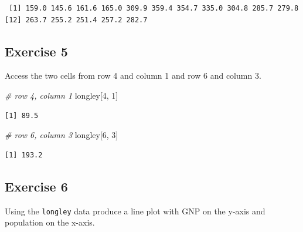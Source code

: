 \documentclass[]{book}
\newenvironment{Shaded}{\begin{snugshade}}{\end{snugshade}}
\newcommand{\KeywordTok}[1]{\textcolor[rgb]{0.13,0.29,0.53}{\textbf{#1}}}
\newcommand{\DataTypeTok}[1]{\textcolor[rgb]{0.13,0.29,0.53}{#1}}
\newcommand{\DecValTok}[1]{\textcolor[rgb]{0.00,0.00,0.81}{#1}}
\newcommand{\StringTok}[1]{\textcolor[rgb]{0.31,0.60,0.02}{#1}}
\newcommand{\CommentTok}[1]{\textcolor[rgb]{0.56,0.35,0.01}{\textit{#1}}}
\newcommand{\OperatorTok}[1]{\textcolor[rgb]{0.81,0.36,0.00}{\textbf{#1}}}
\newcommand{\NormalTok}[1]{#1}
\theoremstyle{definition}
\theoremstyle{definition}
\theoremstyle{definition}
\theoremstyle{remark}
\begin{document}
\begin{verbatim}
 [1] 159.0 145.6 161.6 165.0 309.9 359.4 354.7 335.0 304.8 285.7 279.8
[12] 263.7 255.2 251.4 257.2 282.7
\end{verbatim}

\subsection{Exercise 5}\label{exercise-5-1}

Access the two cells from row 4 and column 1 and row 6 and column 3.

\begin{Shaded}
\begin{Highlighting}[]
\CommentTok{# row 4, column 1}
\NormalTok{longley[}\DecValTok{4}\NormalTok{, }\DecValTok{1}\NormalTok{]}
\end{Highlighting}
\end{Shaded}

\begin{verbatim}
[1] 89.5
\end{verbatim}

\begin{Shaded}
\begin{Highlighting}[]
\CommentTok{# row 6, column 3}
\NormalTok{longley[}\DecValTok{6}\NormalTok{, }\DecValTok{3}\NormalTok{]}
\end{Highlighting}
\end{Shaded}

\begin{verbatim}
[1] 193.2
\end{verbatim}

\subsection{Exercise 6}\label{exercise-6-1}

Using the \texttt{longley} data produce a line plot with GNP on the
y-axis and population on the x-axis.

\begin{Shaded}
\end{Shaded}
\end{document}
